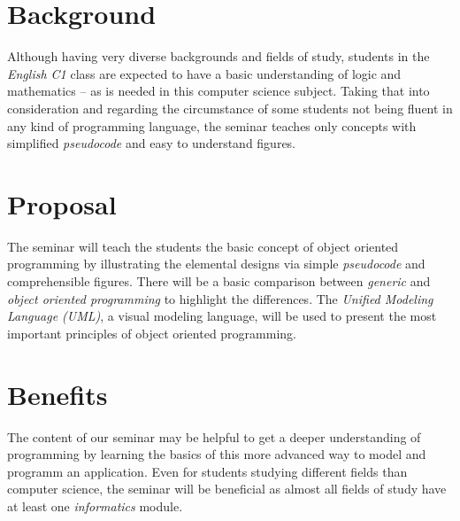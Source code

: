 \section*{Background}
Although having very diverse backgrounds and fields of study, students in the \emph{English C1} class are expected to have a basic understanding of logic and mathematics -- as is needed in this computer science subject. Taking that into consideration and regarding the circumstance of some students not being fluent in any kind of programming language, the seminar teaches only concepts with simplified \emph{pseudocode} and easy to understand figures.
\section*{Proposal}
The seminar will teach the students the basic concept of object oriented programming by illustrating the elemental designs via simple \emph{pseudocode} and comprehensible figures. There will be a basic comparison between \emph{generic} and \emph{object oriented programming} to highlight the differences. The \emph{Unified Modeling Language (UML)}, a visual modeling language, will be used to present the most important principles of object oriented programming.
\section*{Benefits}
The content of our seminar may be helpful to get a deeper understanding of programming by learning the basics of this more advanced way to model and programm an application. Even for students studying different fields than computer science, the seminar will be beneficial as almost all fields of study have at least one \emph{informatics} module.


